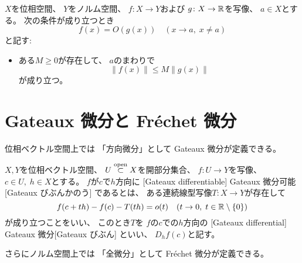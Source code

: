 \documentclass[report]{jlreq}
\begin{document}
\begin{definition}[Big-O 記法]
    $X$を位相空間、
    $Y$をノルム空間、
    $f \colon X \to Y$および
    $g \colon X \to \mathbb{R}$を写像、
    $a \in X$とする。
    次の条件が成り立つとき
    \begin{equation}
        f(x) = O(g(x)) \quad (x \to a, \; x \neq a)
    \end{equation}
    と記す:
    \begin{itemize}
        \item ある$M \ge 0$が存在して、
            $a$のまわりで
            \begin{equation}
                \| f(x) \| \le M \| g(x) \|
            \end{equation}
            が成り立つ。
    \end{itemize}
\end{definition}


%
\section{Gateaux 微分と Fr\'echet 微分}

位相ベクトル空間上では
「方向微分」として Gateaux 微分が定義できる。

\begin{definition}[Gateaux 微分]
    $X, Y$を位相ベクトル空間、
    $U \stackrel{\text{open}}{\subset} X$を開部分集合、
    $f \colon U \to Y$を写像、
    $c \in U, \; h \in X$とする。
    $f$が$c$で$h$方向に
    [Gateaux differentiable]
        {Gateaux 微分可能}[Gateaux びぶんかのう]
    であるとは、
    ある連続線型写像$T \colon X \to Y$が存在して
    \begin{equation}
        f(c + th) - f(c) - T(th) = o(t)
            \quad (t \to 0, \; t \in \mathbb{R} \setminus \{ 0 \})
    \end{equation}
    が成り立つことをいい、
    このとき$T$を
    $f$の$c$での$h$方向の
    [Gateaux differential]
        {Gateaux 微分}[Gateaux びぶん]
    といい、
    $D_hf(c)$と記す。
\end{definition}

さらにノルム空間上では
「全微分」として Fr\'echet 微分が定義できる。
\end{document}
